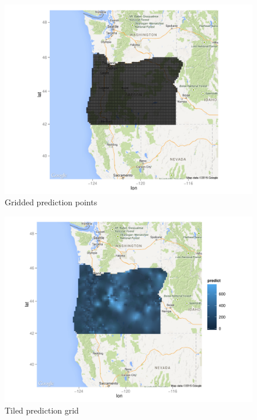 \documentclass[12pt,twoside]{reedthesis}
\begin{document}
 
 \begin{figure}[h!]
	   
	       \centering
	  
	    \includegraphics[scale=0.7]{pred_points}
	
	     \caption{Gridded prediction points}
	 \label{grid}
	\end{figure}
 
\begin{figure}[h!]
	   
	       \centering
	  
	    \includegraphics[scale=0.7]{tileplot}
	
	     \caption{Tiled prediction grid}
	 \label{tile}
	\end{figure}
	
\end{document}
